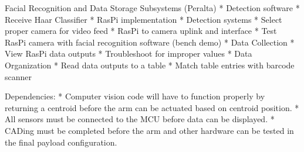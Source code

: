 ﻿\documentclass[10pt]{article}
\begin{document}
Facial Recognition and Data Storage Subsystems (Peralta)
* Detection software
   * Receive Haar Classifier
   * RasPi implementation
* Detection systems
   * Select proper camera for video feed
   * RasPi to camera uplink and interface
   * Test RasPi camera with facial recognition software (bench demo)
* Data Collection
   * View RasPi data outputs
   * Troubleshoot for improper values
* Data Organization
   * Read data outputs to a table
   * Match table entries with barcode scanner

Dependencies:
* Computer vision code will have to function properly by returning a centroid before the arm can be actuated based on centroid position.
* All sensors must be connected to the MCU before data can be displayed.
* CADing must be completed before the arm and other hardware can be tested in the final payload configuration.
\end{document}

